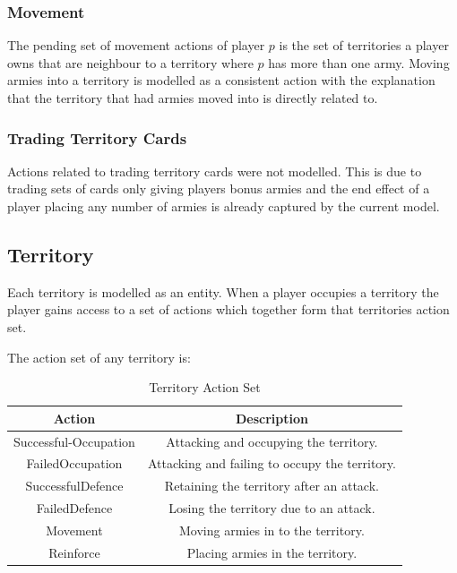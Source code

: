 \documentclass[parskip]{cs4rep}
\begin{document}
\subsubsection{Movement}

The pending set of movement actions of player $p$ is the set of territories a player owns that are neighbour to a territory where $p$ has more than one army. Moving armies into a territory is modelled as a consistent action with the explanation that the territory that had armies moved into is directly related to.

\subsubsection{Trading Territory Cards}

Actions related to trading territory cards were not modelled. This is due to trading sets of cards only giving players bonus armies and the end effect of a player placing any number of armies is already captured by the current model.

\subsection{Territory}

Each territory is modelled as an entity. When a player occupies a territory the player gains access to a set of actions which together form that territories action set.

The action set of any territory is:

\begin{table}[ht]
\centering
\begin{tabular}{|c|c|}
\hline 
\textbf{Action} & \textbf{Description} \\ 
\hline 
Successful-Occupation & Attacking and occupying the territory.\\ 
\hline 
FailedOccupation & Attacking and failing to occupy the territory.\\ 
\hline 
SuccessfulDefence & Retaining the territory after an attack.\\ 
\hline 
FailedDefence & Losing the territory due to an attack.\\
\hline
Movement & Moving armies in to the territory.\\
\hline  
Reinforce & Placing armies in the territory.\\
\hline 
\end{tabular}
\caption{Territory Action Set}
\label{table:territory-actions-bonus}
\end{table}
\end{document}
